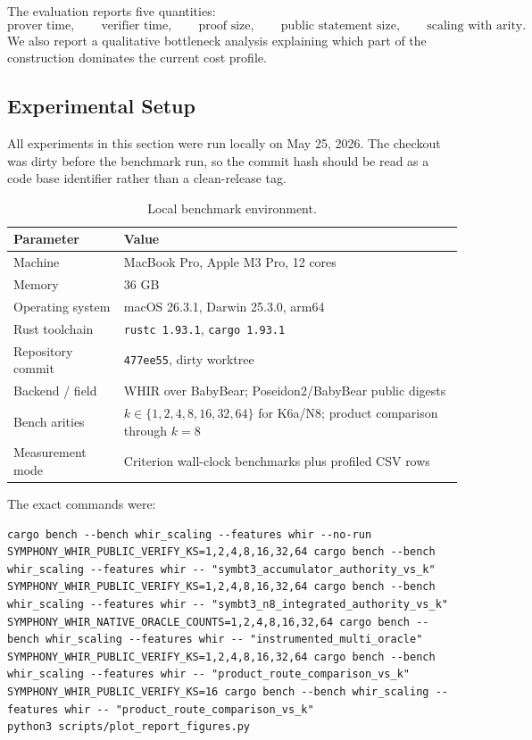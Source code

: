 \documentclass[11pt]{article}
\theoremstyle{definition}
\begin{document}
The evaluation reports five quantities:
\[
  \text{prover time},\qquad
  \text{verifier time},\qquad
  \text{proof size},\qquad
  \text{public statement size},\qquad
  \text{scaling with arity}.
\]
We also report a qualitative bottleneck analysis explaining which part of the
construction dominates the current cost profile.

\subsection{Experimental Setup}
\label{sec:experimental-setup}

All experiments in this section were run locally on May 25, 2026. The checkout
was dirty before the benchmark run, so the commit hash should be read as a code
base identifier rather than a clean-release tag.

\begin{table}[H]
\centering
\small
\begin{tabular}{ll}
\toprule
\textbf{Parameter} & \textbf{Value} \\
\midrule
Machine & MacBook Pro, Apple M3 Pro, 12 cores \\
Memory & 36 GB \\
Operating system & macOS 26.3.1, Darwin 25.3.0, arm64 \\
Rust toolchain & \texttt{rustc 1.93.1}, \texttt{cargo 1.93.1} \\
Repository commit & \texttt{477ee55}, dirty worktree \\
Backend / field & WHIR over BabyBear; Poseidon2/BabyBear public digests \\
Bench arities & \(k\in\{1,2,4,8,16,32,64\}\) for K6a/N8; product comparison through \(k=8\) \\
Measurement mode & Criterion wall-clock benchmarks plus profiled CSV rows \\
\bottomrule
\end{tabular}
\caption{Local benchmark environment.}
\label{tab:evaluation-environment}
\end{table}

The exact commands were:
\begin{lstlisting}[basicstyle=\scriptsize\ttfamily]
cargo bench --bench whir_scaling --features whir --no-run
SYMPHONY_WHIR_PUBLIC_VERIFY_KS=1,2,4,8,16,32,64 cargo bench --bench whir_scaling --features whir -- "symbt3_accumulator_authority_vs_k"
SYMPHONY_WHIR_PUBLIC_VERIFY_KS=1,2,4,8,16,32,64 cargo bench --bench whir_scaling --features whir -- "symbt3_n8_integrated_authority_vs_k"
SYMPHONY_WHIR_NATIVE_ORACLE_COUNTS=1,2,4,8,16,32,64 cargo bench --bench whir_scaling --features whir -- "instrumented_multi_oracle"
SYMPHONY_WHIR_PUBLIC_VERIFY_KS=1,2,4,8,16,32,64 cargo bench --bench whir_scaling --features whir -- "product_route_comparison_vs_k"
SYMPHONY_WHIR_PUBLIC_VERIFY_KS=16 cargo bench --bench whir_scaling --features whir -- "product_route_comparison_vs_k"
python3 scripts/plot_report_figures.py
\end{lstlisting}
\end{document}
